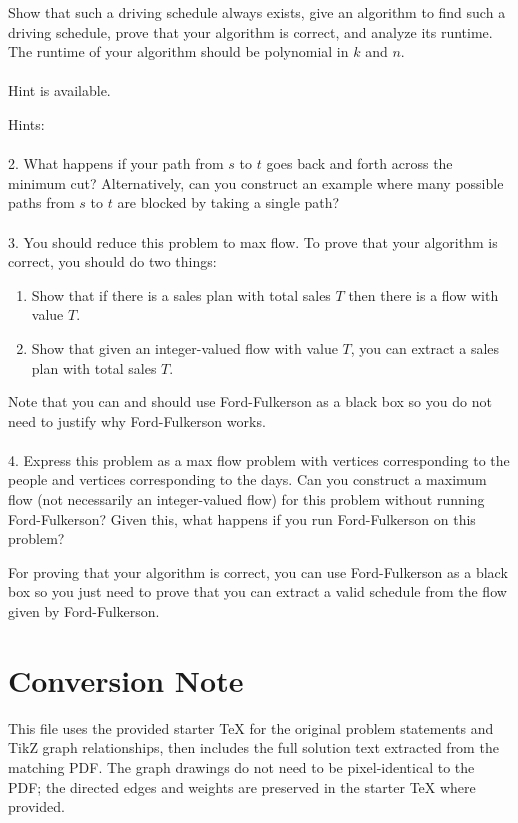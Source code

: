 \documentclass[12pt]{article}
\begin{document}
Show that such a driving schedule always exists, give an algorithm to find such a driving schedule, prove that your algorithm is correct, and analyze its runtime. The runtime of your algorithm should be polynomial in $k$ and $n$.\\
\\
Hint is available.

\newpage
\noindent Hints:\\
\\
2. What happens if your path from $s$ to $t$ goes back and forth across the minimum
cut? Alternatively, can you construct an example where many possible paths from $s$
to $t$ are blocked by taking a single path?\\
\\
3. You should reduce this problem to max flow. To prove that your algorithm is correct, you should do two things:
\begin{enumerate}
\item Show that if there is a sales plan with total sales $T$ then there is a flow with value $T$.
\item Show that given an integer-valued flow with value $T$, you can extract a sales plan with total sales $T$.
\end{enumerate}
Note that you can and should use Ford-Fulkerson as a black box so you do not need to justify why Ford-Fulkerson works.\\
\\
4. Express this problem as a max flow problem with vertices corresponding to the people and vertices corresponding to the days. Can you construct a maximum flow (not necessarily an integer-valued flow) for this problem without running Ford-Fulkerson? Given this, what happens if you run Ford-Fulkerson on this problem?

For proving that your algorithm is correct, you can use Ford-Fulkerson as a black box so you just need to prove that you can extract a valid schedule from the flow given by Ford-Fulkerson.


\newpage
\section*{Conversion Note}
This file uses the provided starter TeX for the original problem statements and TikZ graph relationships, then includes the full solution text extracted from the matching PDF. The graph drawings do not need to be pixel-identical to the PDF; the directed edges and weights are preserved in the starter TeX where provided.
\end{document}
